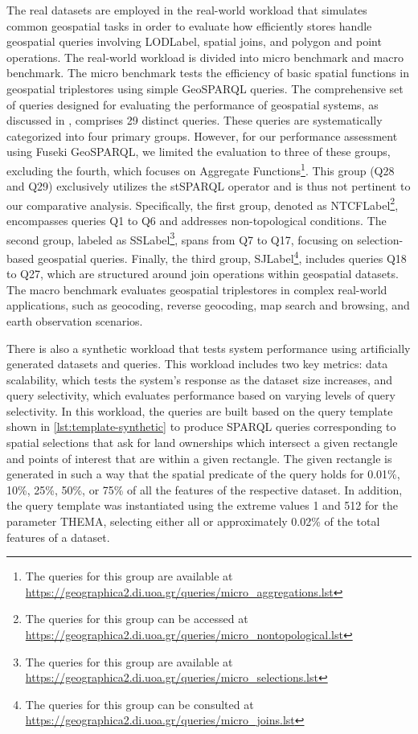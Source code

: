 The real datasets are employed in the real-world workload that simulates common geospatial tasks in order to evaluate how efficiently stores handle geospatial queries involving \acrshort{LODLabel}, spatial joins, and polygon and point operations. The real-world workload is divided into micro benchmark and macro benchmark. The micro benchmark tests the efficiency of basic spatial functions in geospatial triplestores using simple GeoSPARQL queries. The comprehensive set of queries designed for evaluating the performance of geospatial systems, as discussed in \cite{ioannidisEvaluatingGeospatialRDF2021}, comprises 29 distinct queries. These queries are systematically categorized into four primary groups. However, for our performance assessment using Fuseki GeoSPARQL, we limited the evaluation to three of these groups, excluding the fourth, which focuses on Aggregate Functions\footnote{The queries for this group are available at \url{https://geographica2.di.uoa.gr/queries/micro_aggregations.lst}}. This group (Q28 and Q29) exclusively utilizes the stSPARQL operator and is thus not pertinent to our comparative analysis. Specifically, the first group, denoted as \acrfull{NTCFLabel}\footnote{The queries for this group can be accessed at \url{https://geographica2.di.uoa.gr/queries/micro_nontopological.lst}}, encompasses queries Q1 to Q6 and addresses non-topological conditions. The second group, labeled as \acrfull{SSLabel}\footnote{The queries for this group are available at \url{https://geographica2.di.uoa.gr/queries/micro_selections.lst}}, spans from Q7 to Q17, focusing on selection-based geospatial queries. Finally, the third group, \acrfull{SJLabel}\footnote{The queries for this group can be consulted at \url{https://geographica2.di.uoa.gr/queries/micro_joins.lst}}, includes queries Q18 to Q27, which are structured around join operations within geospatial datasets.
The macro benchmark evaluates geospatial triplestores in complex real-world applications, such as geocoding, reverse geocoding, map search and browsing, and earth observation scenarios.

There is also a synthetic workload that tests system performance using artificially generated datasets and queries. This workload includes two key metrics: data scalability, which tests the system's response as the dataset size increases, and query selectivity, which evaluates performance based on varying levels of query selectivity. In this workload, the queries are built based on the query template shown in \ref{lst:template-synthetic} to produce SPARQL queries corresponding to spatial selections that ask for land ownerships which intersect a given rectangle and points of interest that are within a given rectangle. The given rectangle is generated in such a way that the spatial predicate of the query holds for 0.01\%, 10\%, 25\%, 50\%, or 75\% of all the features of the respective dataset. In addition, the query template was instantiated using the extreme values 1 and 512 for the parameter THEMA, selecting either all or approximately 0.02\% of the total features of a dataset.

